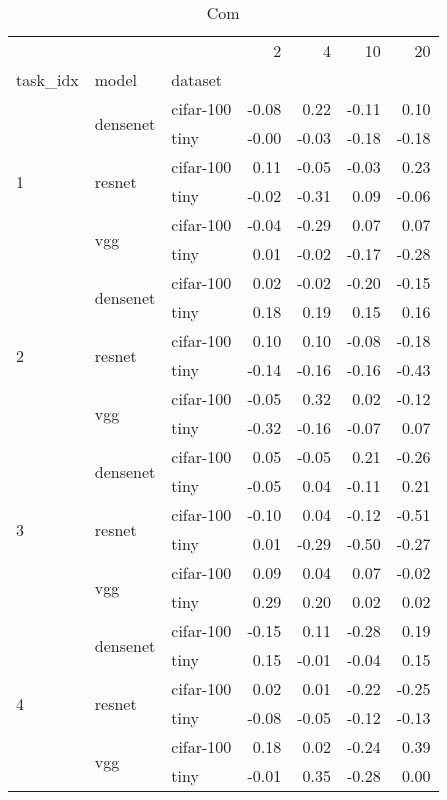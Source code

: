 \begin{table}
\caption{Com}
\begin{tabular}{lllrrrr}
\toprule
 &  &  & 2 & 4 & 10 & 20 \\
task_idx & model & dataset &  &  &  &  \\
\midrule
\multirow[c]{6}{*}{1} & \multirow[c]{2}{*}{densenet} & cifar-100 & -0.08 & 0.22 & -0.11 & 0.10 \\
 &  & tiny & -0.00 & -0.03 & -0.18 & -0.18 \\
 & \multirow[c]{2}{*}{resnet} & cifar-100 & 0.11 & -0.05 & -0.03 & 0.23 \\
 &  & tiny & -0.02 & -0.31 & 0.09 & -0.06 \\
 & \multirow[c]{2}{*}{vgg} & cifar-100 & -0.04 & -0.29 & 0.07 & 0.07 \\
 &  & tiny & 0.01 & -0.02 & -0.17 & -0.28 \\
\multirow[c]{6}{*}{2} & \multirow[c]{2}{*}{densenet} & cifar-100 & 0.02 & -0.02 & -0.20 & -0.15 \\
 &  & tiny & 0.18 & 0.19 & 0.15 & 0.16 \\
 & \multirow[c]{2}{*}{resnet} & cifar-100 & 0.10 & 0.10 & -0.08 & -0.18 \\
 &  & tiny & -0.14 & -0.16 & -0.16 & -0.43 \\
 & \multirow[c]{2}{*}{vgg} & cifar-100 & -0.05 & 0.32 & 0.02 & -0.12 \\
 &  & tiny & -0.32 & -0.16 & -0.07 & 0.07 \\
\multirow[c]{6}{*}{3} & \multirow[c]{2}{*}{densenet} & cifar-100 & 0.05 & -0.05 & 0.21 & -0.26 \\
 &  & tiny & -0.05 & 0.04 & -0.11 & 0.21 \\
 & \multirow[c]{2}{*}{resnet} & cifar-100 & -0.10 & 0.04 & -0.12 & -0.51 \\
 &  & tiny & 0.01 & -0.29 & -0.50 & -0.27 \\
 & \multirow[c]{2}{*}{vgg} & cifar-100 & 0.09 & 0.04 & 0.07 & -0.02 \\
 &  & tiny & 0.29 & 0.20 & 0.02 & 0.02 \\
\multirow[c]{6}{*}{4} & \multirow[c]{2}{*}{densenet} & cifar-100 & -0.15 & 0.11 & -0.28 & 0.19 \\
 &  & tiny & 0.15 & -0.01 & -0.04 & 0.15 \\
 & \multirow[c]{2}{*}{resnet} & cifar-100 & 0.02 & 0.01 & -0.22 & -0.25 \\
 &  & tiny & -0.08 & -0.05 & -0.12 & -0.13 \\
 & \multirow[c]{2}{*}{vgg} & cifar-100 & 0.18 & 0.02 & -0.24 & 0.39 \\
 &  & tiny & -0.01 & 0.35 & -0.28 & 0.00 \\
\bottomrule
\end{tabular}
\end{table}
